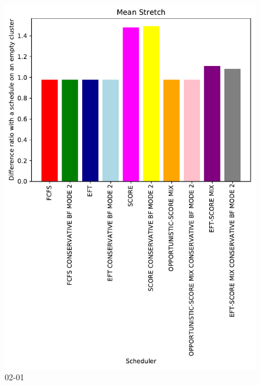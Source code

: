 \documentclass[a4paper]{article}
\begin{document}
\begin{figure}\includegraphics[width=0.9\linewidth]{MBSS/plot/Results_FCFS_Score_Backfill_2022-02-01->2022-02-01_V10000_Mean_Stretch_450_128_32_256_4_1024.pdf}\caption{02-01}\end{figure}
\end{document}
